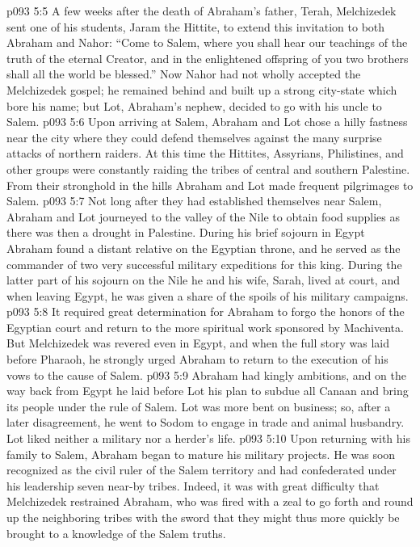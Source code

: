 \vs p093 5:5 A few weeks after the death of Abraham’s father, Terah, Melchizedek sent one of his students, Jaram the Hittite, to extend this invitation to both Abraham and Nahor: “Come to Salem, where you shall hear our teachings of the truth of the eternal Creator, and in the enlightened offspring of you two brothers shall all the world be blessed.” Now Nahor had not wholly accepted the Melchizedek gospel; he remained behind and built up a strong city\hyp{}state which bore his name; but Lot, Abraham’s nephew, decided to go with his uncle to Salem.
\vs p093 5:6 Upon arriving at Salem, Abraham and Lot chose a hilly fastness near the city where they could defend themselves against the many surprise attacks of northern raiders. At this time the Hittites, Assyrians, Philistines, and other groups were constantly raiding the tribes of central and southern Palestine. From their stronghold in the hills Abraham and Lot made frequent pilgrimages to Salem.
\vs p093 5:7 \pc Not long after they had established themselves near Salem, Abraham and Lot journeyed to the valley of the Nile to obtain food supplies as there was then a drought in Palestine. During his brief sojourn in Egypt Abraham found a distant relative on the Egyptian throne, and he served as the commander of two very successful military expeditions for this king. During the latter part of his sojourn on the Nile he and his wife, Sarah, lived at court, and when leaving Egypt, he was given a share of the spoils of his military campaigns.
\vs p093 5:8 It required great determination for Abraham to forgo the honors of the Egyptian court and return to the more spiritual work sponsored by Machiventa. But Melchizedek was revered even in Egypt, and when the full story was laid before Pharaoh, he strongly urged Abraham to return to the execution of his vows to the cause of Salem.
\vs p093 5:9 \pc Abraham had kingly ambitions, and on the way back from Egypt he laid before Lot his plan to subdue all Canaan and bring its people under the rule of Salem. Lot was more bent on business; so, after a later disagreement, he went to Sodom to engage in trade and animal husbandry. Lot liked neither a military nor a herder’s life.
\vs p093 5:10 Upon returning with his family to Salem, Abraham began to mature his military projects. He was soon recognized as the civil ruler of the Salem territory and had confederated under his leadership seven near\hyp{}by tribes. Indeed, it was with great difficulty that Melchizedek restrained Abraham, who was fired with a zeal to go forth and round up the neighboring tribes with the sword that they might thus more quickly be brought to a knowledge of the Salem truths.
